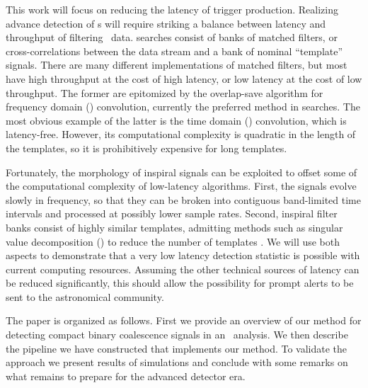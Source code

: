 This work will focus on reducing the latency of trigger production.  Realizing
advance detection of \CBC{}s will require striking a balance between latency
and throughput of filtering \GW\ data. \CBC{} searches consist of banks of
matched filters, or cross-correlations between the data stream and a bank of
nominal ``template'' signals.  There are many different implementations of
matched filters, but most have high throughput at the cost of high latency, or
low latency at the cost of low throughput.  The former are epitomized by the
overlap-save algorithm %
for frequency domain (\FD) convolution, currently the preferred method in \GW{}
searches.  The most obvious example of the latter is the time domain (\TD)
convolution, which is latency-free.  However, its computational complexity is
quadratic in the length of the templates, so it is prohibitively expensive for
long templates.

Fortunately, the morphology of inspiral signals can be exploited to offset some
of the computational complexity of low-latency algorithms.  First, the signals
evolve slowly in frequency, so that they can be broken into contiguous
band-limited time intervals and processed at possibly lower sample rates.
Second, inspiral filter banks consist of highly similar templates, admitting
methods such as singular value decomposition (\SVD{}) to reduce the number of
templates \citep{Cannon:2010p10398}. We will use both aspects to demonstrate
that a very low latency detection statistic is possible with current computing
resources.  Assuming the other technical sources of latency can be reduced
significantly, this should allow the possibility for prompt alerts to be sent
to the astronomical community.

The paper is organized as follows. First we provide an overview of our method
for detecting compact binary coalescence signals in an \earlywarning\ analysis.
We then describe the pipeline we have constructed that implements our method.
To validate the approach we present results of simulations and conclude with
some remarks on what remains to prepare for the advanced detector era.

